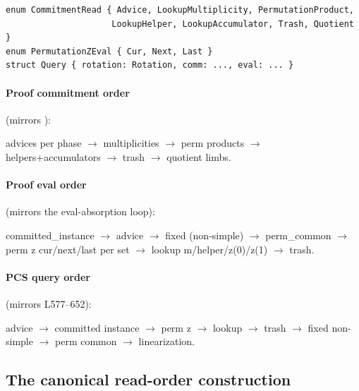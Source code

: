 \begin{lstlisting}[style=rust]
enum CommitmentRead { Advice, LookupMultiplicity, PermutationProduct,
                     LookupHelper, LookupAccumulator, Trash, Quotient }
enum PermutationZEval { Cur, Next, Last }
struct Query { rotation: Rotation, comm: ..., eval: ... }
\end{lstlisting}

\paragraph{Proof commitment order} (mirrors ):\\[2pt]
{\centering\small advices per phase $\rightarrow$ multiplicities $\rightarrow$
perm products $\rightarrow$ helpers+accumulators $\rightarrow$ trash
$\rightarrow$ quotient limbs.\par}

\paragraph{Proof eval order} (mirrors the eval-absorption loop):\\[2pt]
{\centering\small committed\_instance $\rightarrow$ advice $\rightarrow$
fixed (non-simple) $\rightarrow$ perm\_common $\rightarrow$
perm z cur/next/last per set $\rightarrow$
lookup m/helper/z(0)/z(1) $\rightarrow$ trash.\par}

\paragraph{PCS query order} (mirrors  L577--652):\\[2pt]
{\centering\small advice $\rightarrow$ committed instance $\rightarrow$
perm z $\rightarrow$ lookup $\rightarrow$ trash $\rightarrow$
fixed non-simple $\rightarrow$ perm common $\rightarrow$ linearization.\par}

\subsection{The canonical read-order construction}
\label{sec:read-order}

